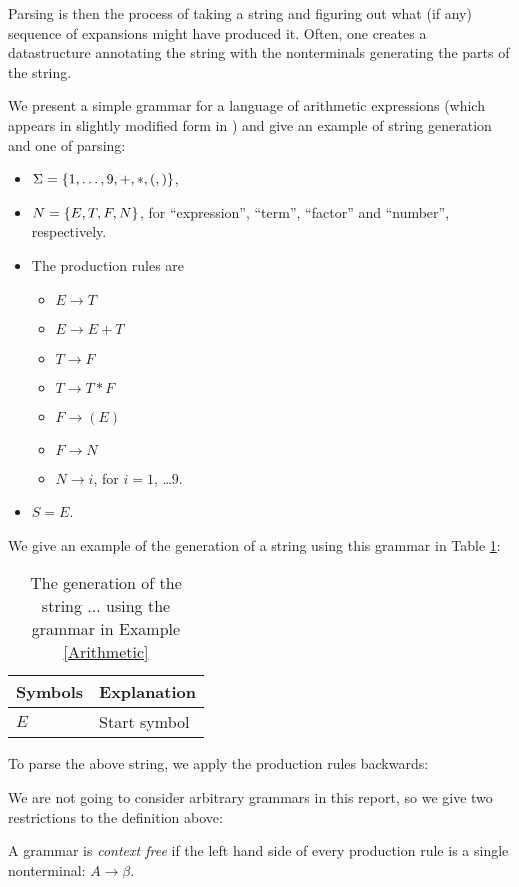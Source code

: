Parsing is then the process of taking a string and figuring out what (if any) sequence of expansions might have produced it. Often, one creates a datastructure annotating the string with the nonterminals generating the parts of the string.
\begin{Example}
  \label{Arithmetic}
  We present a simple grammar for a language of arithmetic expressions (which appears in slightly modified form in \cite{Lange-Leiss}) and give an example of string generation and one of parsing:
  \begin{itemize}
  \item $\Sigma = \{1,\ldots , 9, +, *, (, )\}$,
  \item $N = \{E, T, F, N\}$, for ``expression'', ``term'', ``factor'' and ``number'', respectively.
  \item The production rules are
    \begin{itemize}
    \item \label{p1} $E \to T$
    \item \label{p2} $E \to E + T$
    \item \label{p3} $T \to F$
    \item \label{p4} $T \to T * F$ 
    \item \label{p5} $F \to ( E )$
    \item \label{p6} $F \to N$
    \item \label{p7} $N \to i$, for $i = 1$, \ldots $9$. 
    \end{itemize}
  \item $S = E$.
  \end{itemize}
  We give an example of the generation of a string using this grammar in Table \ref{Str-Gen}: 
  \begin{table}
    \centering
    \begin{tabular}{l||l}
      Symbols & Explanation \\\hline
      $E$ & Start symbol
    \end{tabular}
    \caption{The generation of the string $...$ using the grammar in Example \ref{Arithmetic}\label{Str-Gen}}
  \end{table}
  
  To parse the above string, we apply the production rules backwards: 
  
\end{Example}
We are not going to consider arbitrary grammars in this report, so we give two restrictions to the definition above: 
\begin{Definition}
  A grammar is \emph{context free} if the left hand side of every production rule is a single nonterminal: $A \to \beta$.
\end{Definition}
